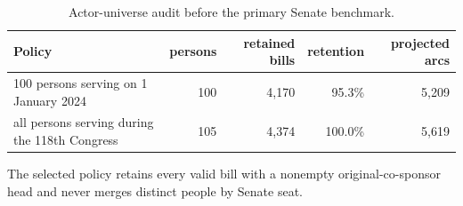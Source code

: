 \begin{table}[tbp]
\centering
\small
\caption{Actor-universe audit before the primary Senate benchmark.}
\label{tab:actor-universe-audit}
\begin{tabular}{p{}rrrr}
\toprule
Policy & persons & retained bills & retention & projected arcs \\
\midrule
100 persons serving on 1 January 2024 & 100 & 4,170 & 95.3\% & 5,209 \\
all persons serving during the 118th Congress & 105 & 4,374 & 100.0\% & 5,619 \\
\bottomrule
\end{tabular}
\par\vspace{2pt}\footnotesize The selected policy retains every valid bill with a nonempty original-co-sponsor head and never merges distinct people by Senate seat.
\end{table}
